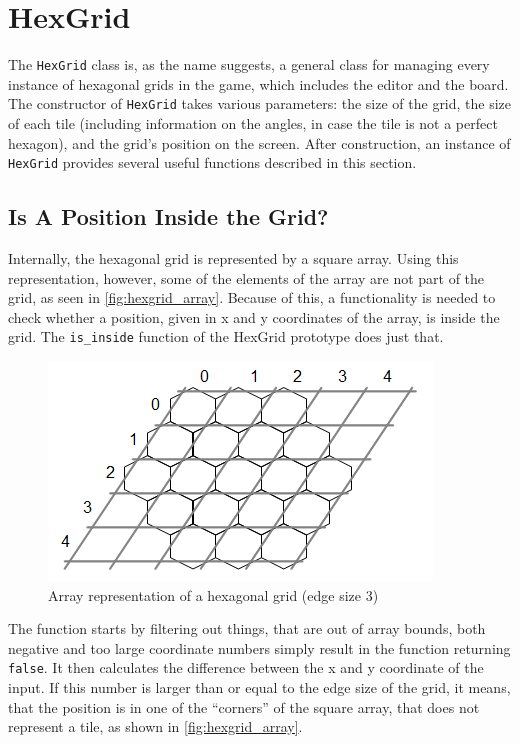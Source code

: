 \section{HexGrid}
\label{sec:hexgrid}

The \texttt{HexGrid} class is, as the name suggests, a general class for managing every instance of hexagonal grids in the game, which includes the editor and the board.
The constructor of \texttt{HexGrid} takes various parameters: the size of the grid, the size of each tile (including information on the angles, in case the tile is not a perfect hexagon), and the grid's position on the screen.
After construction, an instance of \texttt{HexGrid} provides several useful functions described in this section.

\subsection{Is A Position Inside the Grid?}
Internally, the hexagonal grid is represented by a square array.
Using this representation, however, some of the elements of the array are not part of the grid, as seen in \autoref{fig:hexgrid_array}.
Because of this, a functionality is needed to check whether a position, given in x and y coordinates of the array, is inside the grid.
The \texttt{is\_inside} function of the HexGrid prototype does just that.

\begin{figure}[ht]
	\includegraphics[scale=1]{img/hexgrid_array.png}
	\caption{Array representation of a hexagonal grid (edge size 3)}
	\label{fig:hexgrid_array}
\end{figure}

The function starts by filtering out things, that are out of array bounds, both negative and too large coordinate numbers simply result in the function returning \verb|false|.
It then calculates the difference between the x and y coordinate of the input.
If this number is larger than or equal to the edge size of the grid, it means, that the position is in one of the ``corners'' of the square array, that does not represent a tile, as shown in \autoref{fig:hexgrid_array}.

